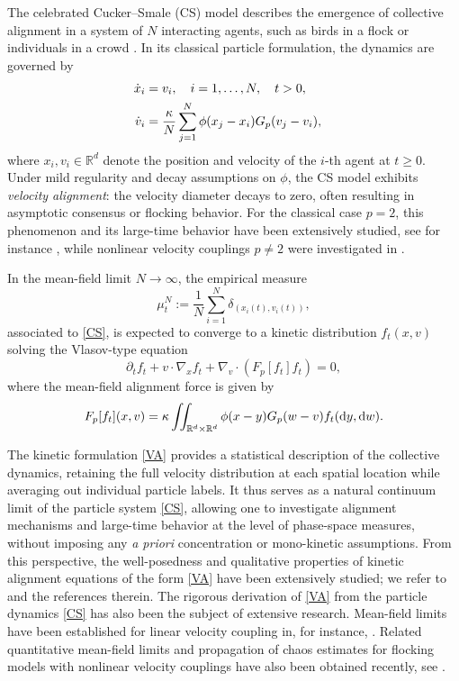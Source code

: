 \documentclass[10pt,reqno]{amsart}
\renewcommand{\geq}{\geqslant}
\numberwithin{equation}{section}
\newcommand{\R}{\mathbb R}
\newcommand{\bq}{\begin{equation}}
\newcommand{\eq}{\end{equation}}
\newcommand{\pa}{\partial}
\newcommand{\intrr}{\iint_{\R^d \times \R^d}}
\newcommand{\dy}{\textnormal{d}y}
\newcommand{\dw}{\textnormal{d}w}
\begin{document}
%
%
%                      
%
%
\medskip
{} The celebrated Cucker--Smale (CS) model describes the emergence of collective alignment in a system of $N$ interacting agents, such as birds in a flock or individuals in a crowd \cite{CS07}. In its classical particle formulation, the dynamics are governed by
\begin{align}\label{CS}
\begin{aligned}
\dot{x}_i &= v_i, \quad i=1,\dots, N, \quad t > 0,\cr
\dot{v}_i &= \frac\kappa N \sum_{j=1}^N\phi (x_j - x_i)G_p(v_j - v_i),
\end{aligned}
\end{align}
where $x_i,v_i\in\R^d$ denote the position and velocity of the $i$-th agent at $t\geq0$. Under mild regularity and decay assumptions on $\phi$, the CS model exhibits \emph{velocity alignment}: the velocity diameter decays to zero, often resulting in asymptotic consensus or flocking behavior. For the classical case $p=2$, this phenomenon and its large-time behavior have been extensively studied, see for instance \cite{CS07, HL09, HT08}, while nonlinear velocity couplings $p\neq2$ were investigated in \cite{CRC10,HHK10}.

In the mean-field limit $N\to\infty$, the empirical measure
\[
\mu_t^N:=\frac1N\sum_{i=1}^N \delta_{(x_i(t),v_i(t))},
\]
associated to \eqref{CS}, is expected to converge to a kinetic distribution $f_t(x,v)$ solving the Vlasov-type equation
\bq\label{VA}
\pa_t f_t + v \cdot \nabla_x f_t + \nabla_v \cdot (F_p[f_t]f_t) =0,
\eq
where the mean-field alignment force is given by
\[
F_p[f_t](x,v) = \kappa \intrr \phi(x-y)G_p(w-v)f_t(\dy,\dw).
\]

The kinetic formulation \eqref{VA} provides a statistical description of the collective dynamics, retaining the full velocity distribution at each spatial location while averaging out individual particle labels. It thus serves as a natural continuum limit of the particle system \eqref{CS}, allowing one to investigate alignment mechanisms and large-time behavior at the level of phase-space measures, without imposing any \emph{a priori} concentration or mono-kinetic assumptions. From this perspective, the well-posedness and qualitative properties of kinetic alignment equations
of the form \eqref{VA} have been extensively studied; we refer to \cite{CCH14, CFRT10, CJu23, CZ21, HL09,   KMT13,  MMPZ19} and the references therein. The rigorous derivation of \eqref{VA} from the particle dynamics \eqref{CS} has also been the subject of extensive research. Mean-field limits have been established for linear velocity coupling in, for instance, \cite{CCHS19, CFRT10, HL09}.  Related quantitative mean-field limits and propagation of chaos estimates for flocking models with nonlinear velocity couplings have also been obtained recently, see \cite{NSTpre}.
\end{document}
